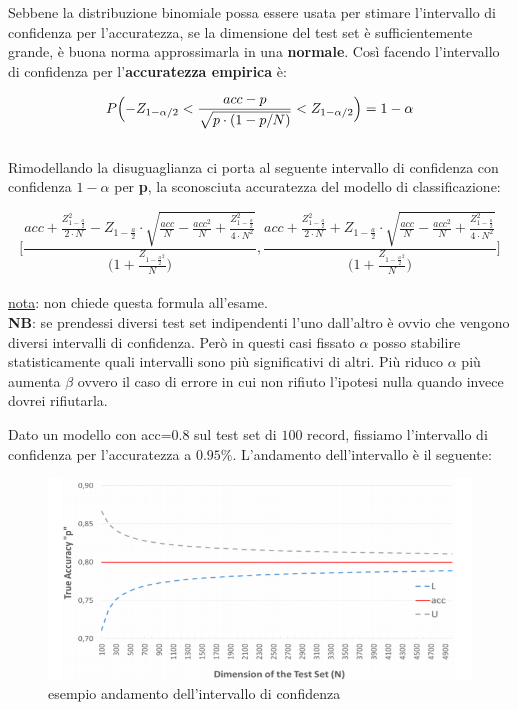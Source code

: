 Sebbene la distribuzione binomiale possa essere usata per stimare l'intervallo di confidenza per l'accuratezza, se la dimensione del test set \`e sufficientemente grande, \`e buona norma approssimarla in una \textbf{normale}. Cos\`i facendo l'intervallo di confidenza per l'\textbf{accuratezza empirica} \`e:

\[ P \Bigl( -Z_{1-\alpha/2} < \frac{acc - p}{\sqrt{p \cdot (1-p / N)}} < Z_{1 - \alpha/2} \Bigr) = 1 - \alpha \]\\

Rimodellando la disuguaglianza ci porta al seguente intervallo di confidenza con confidenza $1-\alpha$ per \textbf{p}, la sconosciuta accuratezza del modello di classificazione:

\[ \Biggl[ \frac{acc + \frac{Z_{1-\frac{a}{2}}^2 }{2 \cdot N} - Z_{1-\frac{a}{2}} \cdot \sqrt{\frac{acc}{N} - \frac{acc^2}{N} + \frac{Z_{1-\frac{a}{2}}^2}{4 \cdot N^2}}}{\bigl(1 + \frac{Z_{1-\frac{a}{2}^2}}{N}\bigr)}
, 
\frac{acc + \frac{Z_{1-\frac{a}{2}}^2 }{2 \cdot N} + Z_{1-\frac{a}{2}} \cdot \sqrt{\frac{acc}{N} - \frac{acc^2}{N} + \frac{Z_{1-\frac{a}{2}}^2}{4 \cdot N^2}}}{\bigl(1 + \frac{Z_{1-\frac{a}{2}^2}}{N}\bigr)} \Biggr] \]\\
\underline{nota}: non chiede questa formula all'esame.\\

\textbf{NB}: se prendessi diversi test set indipendenti l'uno dall'altro \`e ovvio che vengono diversi intervalli di confidenza. Per\`o in questi casi fissato $\alpha$ posso stabilire statisticamente quali intervalli sono pi\`u significativi di altri. Pi\`u riduco $\alpha$ pi\`u aumenta $\beta$ ovvero il caso di errore in cui non rifiuto l'ipotesi nulla quando invece dovrei rifiutarla.

Dato un modello con acc=0.8 sul test set di $100$ record, fissiamo l'intervallo di confidenza per l'accuratezza a $0.95\%$. L'andamento dell'intervallo è il seguente:

\begin{figure}[H]
	\centering
	\includegraphics[height=0.5 \linewidth]{classification/pict/inter_confidence.png}
	\caption{esempio andamento dell'intervallo di confidenza}
\end{figure}

